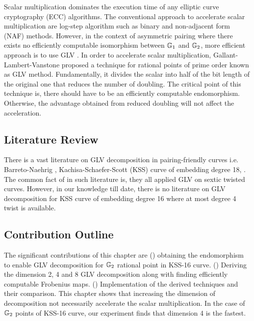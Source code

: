 Scalar multiplication dominates the execution time of any elliptic curve cryptography (ECC) algorithms.
The conventional approach to accelerate scalar multiplication are log-step algorithm such as binary and non-adjacent form (NAF) methods.
However, in the context of asymmetric pairing where there exists no efficiently computable isomorphism between ${\mathbb{G}}_{1}$ and ${\mathbb{G}}_{2}$, more efficient approach is to use GLV \cite{CANS:SNOKM08, khandaker2017improvement}.
In order to accelerate scalar multiplication, Gallant-Lambert-Vanstone \cite{C:GalLamVan01} proposed a technique for rational points of prime order known as GLV method.
Fundamentally, it divides the scalar into half of the bit length of the original one that reduces the number of doubling.
The critical point of this technique is, there should have to be an efficiently computable endomorphism. 
Otherwise, the advantage obtained from reduced doubling will not affect the acceleration. 


\subsection{Literature Review}
There is a vast literature on GLV decomposition in pairing-friendly curves i.e.  Barreto-Naehrig \cite{SAC:BarNae05}, Kachisa-Schaefer-Scott (KSS) curve of embedding degree 18,  \cite{CANS:SNOKM08, khandaker2017improvement, DBLP:journals/ieicet/NogamiSONAM09, faz2015efficient, JC:GalLinSco11}. 
The common fact of in such literature is, they all applied GLV on sextic twisted curves. 
However, in our knowledge till date, there is no literature on GLV decomposition for  KSS curve of embedding degree 16 where at most degree 4 twist is available.

\subsection{Contribution Outline}
The significant contributions of this chapter are () obtaining the endomorphism to enable GLV decomposition for ${\mathbb{G}}_{2}$ rational point in KSS-16 curve. 
() Deriving the dimension 2, 4 and 8 GLV decomposition along with finding efficiently computable Frobenius maps. () Implementation of the derived techniques and their comparison. 
This chapter shows that increasing the dimension of decomposition not necessarily accelerate the scalar multiplication. 
In the case of ${\mathbb{G}}_{2}$ points of KSS-16 curve, our experiment finds that dimension 4 is the fastest. 

